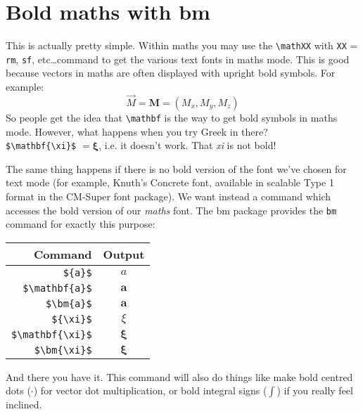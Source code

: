 \documentclass[12pt,article]{memoir}
\begin{document}
\chapter*{Bold maths with \textsf{bm}}

This is actually pretty simple. Within maths you may use the \verb|\mathXX| with \texttt{XX} = \texttt{rm}, \texttt{sf}, etc\dots command to get the various text fonts in maths mode. This is good because vectors in maths are often displayed with upright bold symbols. For example:
\[
\vec{M} = \mathbf{M} = (M_x,M_y,M_z)
\]
So people get the idea that \verb|\mathbf| is the way to get bold symbols in maths mode. However, what happens when you try Greek in there?\\
\verb|$\mathbf{\xi}$| $=\mathbf{\xi}$, i.e. it doesn't work. That \textit{xi} is not bold!

The same thing happens if there is no bold version of the font we've chosen for text mode (for example, Knuth's Concrete font, available in scalable Type 1 format in the CM-Super font package). We want instead a command which accesses the bold version of our \emph{maths} font. The \textsf{bm} package provides the \texttt{bm} command for exactly this purpose:

\begin{center}
   \begin{tabular}{@{} rc @{}} %
      \toprule
      Command    & Output \\
      \midrule
	\verb|${a}$| & $a$\\
	\verb|$\mathbf{a}$| & $\mathbf{a}$\\
	\verb|$\bm{a}$| & $\bm{a}$\\
	\midrule
	\verb|${\xi}$| & $\xi$\\
	\verb|$\mathbf{\xi}$| & $\mathbf{\xi}$\\
	\verb|$\bm{\xi}$| & $\bm{\xi}$\\	
      \bottomrule
   \end{tabular}
\end{center}

And there you have it. This command will also do things like make bold centred dots ($\bm{\cdot}$) for vector dot multiplication, or bold integral signs ($\bm{\int}$) if you really feel inclined.
\end{document}
